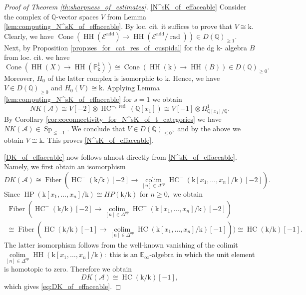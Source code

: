 \documentclass[11pt,leqno]{amsart}
\numberwithin{equation}{section}
\def\Q{\mathbb{Q}}
\def\PP{{\mathbb P}}
\def\rad{\operatorname{rad}}
\DeclareMathOperator*{\colim}{colim}
\newcommand{\Cone}{\operatorname{Cone}}
\newcommand{\Fiber}{\operatorname{Fiber}}
\newcommand{\red}{\operatorname{red}}
\newcommand{\bE}{{\mathbb E}}
\newcommand{\mk}{\mathrm k}
\newcommand{\cA}{{\mathcal A}}
\newcommand{\cE}{{\mathcal E}}
\newcommand{\HH}{\operatorname{HH}}
\newcommand{\HC}{\operatorname{HC}}
\newcommand{\HP}{\operatorname{HP}}
\newcommand{\Sp}{\operatorname{Sp}}
\newcommand{\add}{\operatorname{add}}
\begin{document}
\begin{proof}[Proof of Theorem \ref{th:sharpness_of_estimates}]
\ref{N^sK_of_effaceable} Consider the complex of $\Q$-vector spaces $V$ from Lemma \ref{lem:computing_N^sK_of_effaceable}. By loc. cit. it suffices to prove that $V\cong \mk.$ Clearly, we have $\Cone(\HH(\cE^{\add})\to\HH(\cE^{\add}/\rad))\in D(\Q)_{\geq 1}.$ Next, by Proposition \ref{prop:ses_for_cat_res_of_cuspidal} for the dg $\mk$- algebra $B$ from loc. cit. we have
\begin{equation*}
\Cone(\HH(X)\to\HH(\PP^1_{\mk}))\cong \Cone(\HH(\mk)\to\HH(B))\in D(\Q)_{\geq 0}.
\end{equation*}
Moreover, $H_0$ of the latter complex is isomorphic to $\mk.$ Hence, we have $V\in D(\Q)_{\geq 0}$ and $H_0(V)\cong \mk.$ Applying Lemma \ref{lem:computing_N^sK_of_effaceable} for $s = 1$ we obtain
\begin{equation*}
NK(\cA)\cong V[-2]\otimes\HC^{-,\red}(\Q[x_1])\cong V[-1]\otimes\Omega^1_{\Q[x_1]/\Q}.
\end{equation*}
By Corollary \ref{cor:coconnectivity_for_N^sK_of_t_categories} we have $NK(\cA)\in\Sp_{\leq -1}.$ We conclude that $V\in D(\Q)_{\leq 0},$ and by the above we obtain $V\cong\mk.$ This proves \ref{N^sK_of_effaceable}.

\ref{DK_of_effaceable} now follows almost directly from \ref{N^sK_of_effaceable}. Namely, we first obtain an isomorphism
\begin{equation*}
DK(\cA)\cong \Fiber(\HC^-(\mk/\mk)[-2]\to \colim\limits_{[n]\in\Delta^{op}}\HC^-(\mk[x_1,\dots,x_n]/\mk)[-2]).
\end{equation*}
Since $\HP(\mk[x_1,\dots,x_n]/\mk)\cong HP(\mk/\mk)$ for $n\geq 0,$ we obtain
\begin{multline*}
\Fiber(\HC^-(\mk/\mk)[-2]\to \colim\limits_{[n]\in\Delta^{op}}\HC^-(\mk[x_1,\dots,x_n]/\mk)[-2])\\
\cong \Fiber(\HC(\mk/\mk)[-1]\to\colim\limits_{[n]\in\Delta^{op}}\HC(\mk[x_1,\dots,x_n]/\mk)[-1]))\cong\HC(\mk/\mk)[-1].
\end{multline*}
The latter isomorphism follows from the well-known vanishing of the colimit $\colim\limits_{[n]\in\Delta^{op}}\HH(\mk[x_1,\dots,x_n]/\mk):$ this is an $\bE_{\infty}$-algebra in which the unit element is homotopic to zero. Therefore we obtain
\begin{equation*}
DK(\cA)\cong\HC(\mk/\mk)[-1],
\end{equation*}
which gives \eqref{eq:DK_of_effaceable}.
\end{proof}
\end{document}
